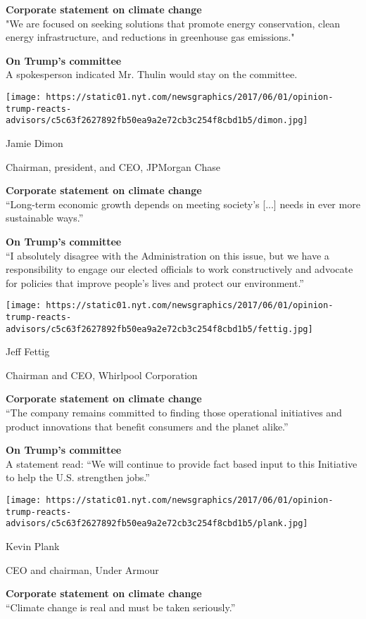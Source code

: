 \textbf{Corporate statement on climate change}\\
"We are focused on seeking solutions that promote energy conservation,
clean energy infrastructure, and reductions in greenhouse gas
emissions."

\textbf{On Trump's committee}\\
A spokesperson indicated Mr. Thulin would stay on the committee.

\texttt{[image: https://static01.nyt.com/newsgraphics/2017/06/01/opinion-trump-reacts-advisors/c5c63f2627892fb50ea9a2e72cb3c254f8cbd1b5/dimon.jpg]}

Jamie Dimon

Chairman, president, and CEO, JPMorgan Chase

\textbf{Corporate statement on climate change}\\
``Long-term economic growth depends on meeting society's {[}...{]} needs
in ever more sustainable ways.''

\textbf{On Trump's committee}\\
``I absolutely disagree with the Administration on this issue, but we
have a responsibility to engage our elected officials to work
constructively and advocate for policies that improve people's lives and
protect our environment.''

\texttt{[image: https://static01.nyt.com/newsgraphics/2017/06/01/opinion-trump-reacts-advisors/c5c63f2627892fb50ea9a2e72cb3c254f8cbd1b5/fettig.jpg]}

Jeff Fettig

Chairman and CEO, Whirlpool Corporation

\textbf{Corporate statement on climate change}\\
``The company remains committed to finding those operational initiatives
and product innovations that benefit consumers and the planet alike.''

\textbf{On Trump's committee}\\
A statement read: ``We will continue to provide fact based input to this
Initiative to help the U.S. strengthen jobs.''

\texttt{[image: https://static01.nyt.com/newsgraphics/2017/06/01/opinion-trump-reacts-advisors/c5c63f2627892fb50ea9a2e72cb3c254f8cbd1b5/plank.jpg]}

Kevin Plank

CEO and chairman, Under Armour

\textbf{Corporate statement on climate change}\\
``Climate change is real and must be taken seriously.''

